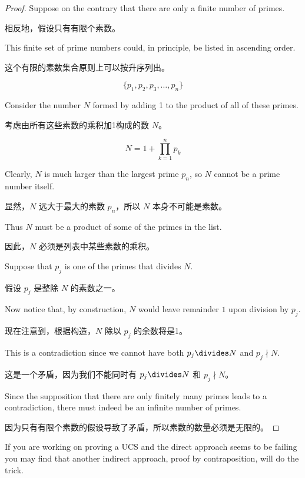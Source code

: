 \begin{proof}
      Suppose on the contrary that there are only a finite number
      of primes.

      相反地，假设只有有限个素数。

      This finite set of prime numbers could, in principle, be listed
      in ascending order.

      这个有限的素数集合原则上可以按升序列出。

      \[  \{ p_1, p_2, p_3, \ldots , p_n \} \]

      Consider the number $N$ formed by adding 1 to the product of all of these
      primes.

      考虑由所有这些素数的乘积加1构成的数 $N$。

      \[ N = 1 + \prod_{k=1}^n p_k \]

      Clearly, $N$ is much larger than the largest prime $p_n$, so $N$ cannot
      be a prime number itself.

      显然，$N$ 远大于最大的素数 $p_n$，所以 $N$ 本身不可能是素数。

      Thus $N$ must be a product of some of the
      primes in the list.

      因此，$N$ 必须是列表中某些素数的乘积。

      Suppose that $p_j$ is one of the primes that
      divides $N$.

      假设 $p_j$ 是整除 $N$ 的素数之一。

      Now notice that, by construction, $N$ would leave remainder
      $1$ upon division by $p_j$.

      现在注意到，根据构造，$N$ 除以 $p_j$ 的余数将是1。

      This is a contradiction since we cannot have
      both $p_j \divides N$ and $p_j \nmid N$.

      这是一个矛盾，因为我们不能同时有 $p_j \divides N$ 和 $p_j \nmid N$。

      Since the supposition that there are only finitely many primes leads to
      a contradiction, there must indeed be an infinite number of primes.

      因为只有有限个素数的假设导致了矛盾，所以素数的数量必须是无限的。
\end{proof}

If you are working on proving a UCS and the direct approach seems to be
failing you may find that another indirect approach,
proof by contraposition,
will do the trick.

